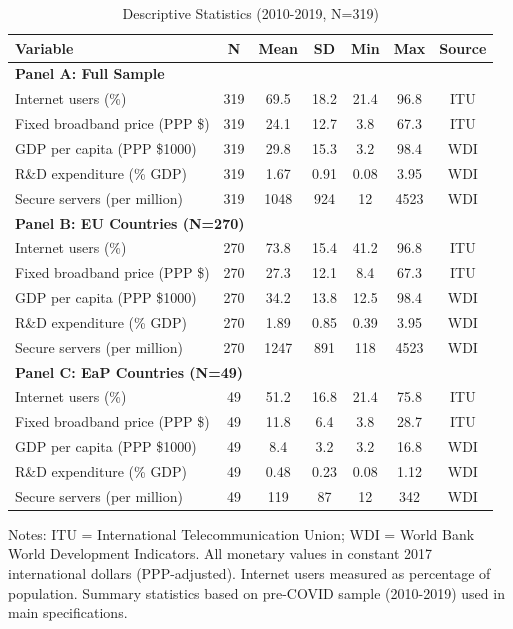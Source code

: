 \documentclass[12pt,review]{elsarticle}
\begin{document}
\begin{table}[htbp]
\centering
\caption{Descriptive Statistics (2010-2019, N=319)}
\label{tab:descriptives}
\begin{threeparttable}
\begin{tabular}{lcccccc}
\toprule
Variable & N & Mean & SD & Min & Max & Source \\
\midrule
\multicolumn{7}{l}{\textbf{Panel A: Full Sample}} \\
Internet users (\%) & 319 & 69.5 & 18.2 & 21.4 & 96.8 & ITU \\
Fixed broadband price (PPP \$) & 319 & 24.1 & 12.7 & 3.8 & 67.3 & ITU \\
GDP per capita (PPP \$1000) & 319 & 29.8 & 15.3 & 3.2 & 98.4 & WDI \\
R\&D expenditure (\% GDP) & 319 & 1.67 & 0.91 & 0.08 & 3.95 & WDI \\
Secure servers (per million) & 319 & 1048 & 924 & 12 & 4523 & WDI \\
\midrule
\multicolumn{7}{l}{\textbf{Panel B: EU Countries (N=270)}} \\
Internet users (\%) & 270 & 73.8 & 15.4 & 41.2 & 96.8 & ITU \\
Fixed broadband price (PPP \$) & 270 & 27.3 & 12.1 & 8.4 & 67.3 & ITU \\
GDP per capita (PPP \$1000) & 270 & 34.2 & 13.8 & 12.5 & 98.4 & WDI \\
R\&D expenditure (\% GDP) & 270 & 1.89 & 0.85 & 0.39 & 3.95 & WDI \\
Secure servers (per million) & 270 & 1247 & 891 & 118 & 4523 & WDI \\
\midrule
\multicolumn{7}{l}{\textbf{Panel C: EaP Countries (N=49)}} \\
Internet users (\%) & 49 & 51.2 & 16.8 & 21.4 & 75.8 & ITU \\
Fixed broadband price (PPP \$) & 49 & 11.8 & 6.4 & 3.8 & 28.7 & ITU \\
GDP per capita (PPP \$1000) & 49 & 8.4 & 3.2 & 3.2 & 16.8 & WDI \\
R\&D expenditure (\% GDP) & 49 & 0.48 & 0.23 & 0.08 & 1.12 & WDI \\
Secure servers (per million) & 49 & 119 & 87 & 12 & 342 & WDI \\
\bottomrule
\end{tabular}
\begin{tablenotes}
\small
\item Notes: ITU = International Telecommunication Union; WDI = World Bank World Development Indicators. All monetary values in constant 2017 international dollars (PPP-adjusted). Internet users measured as percentage of population. Summary statistics based on pre-COVID sample (2010-2019) used in main specifications.
\end{tablenotes}
\end{threeparttable}
\end{table}
\end{document}
